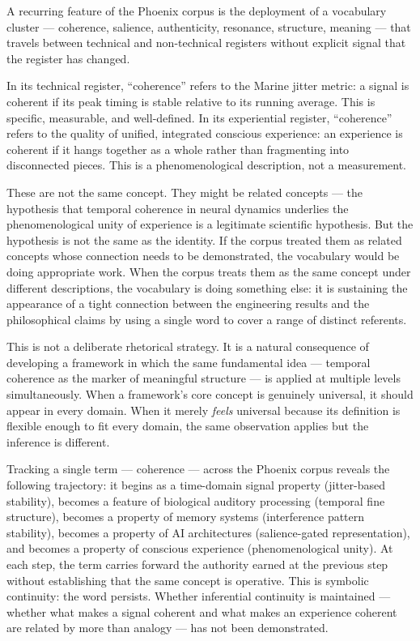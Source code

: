 A recurring feature of the Phoenix corpus is the deployment
of a vocabulary cluster --- coherence, salience, authenticity,
resonance, structure, meaning --- that travels between technical
and non-technical registers without explicit signal that the
register has changed.

In its technical register, ``coherence'' refers to the Marine
jitter metric: a signal is coherent if its peak timing is
stable relative to its running average. This is specific,
measurable, and well-defined. In its experiential register,
``coherence'' refers to the quality of unified, integrated
conscious experience: an experience is coherent if it hangs
together as a whole rather than fragmenting into disconnected
pieces. This is a phenomenological description, not a
measurement.

These are not the same concept. They might be related concepts
--- the hypothesis that temporal coherence in neural dynamics
underlies the phenomenological unity of experience is a
legitimate scientific hypothesis. But the hypothesis is not
the same as the identity. If the corpus treated them as
related concepts whose connection needs to be demonstrated,
the vocabulary would be doing appropriate work. When the
corpus treats them as the same concept under different
descriptions, the vocabulary is doing something else: it
is sustaining the appearance of a tight connection between
the engineering results and the philosophical claims by
using a single word to cover a range of distinct referents.

This is not a deliberate rhetorical strategy. It is a natural
consequence of developing a framework in which the same
fundamental idea --- temporal coherence as the marker of
meaningful structure --- is applied at multiple levels
simultaneously. When a framework's core concept is genuinely
universal, it should appear in every domain. When it merely
\textit{feels} universal because its definition is flexible
enough to fit every domain, the same observation applies
but the inference is different.

\begin{dangerzone}
Tracking a single term --- coherence --- across the Phoenix
corpus reveals the following trajectory: it begins as a
time-domain signal property (jitter-based stability), becomes
a feature of biological auditory processing (temporal fine
structure), becomes a property of memory systems (interference
pattern stability), becomes a property of AI architectures
(salience-gated representation), and becomes a property of
conscious experience (phenomenological unity). At each step,
the term carries forward the authority earned at the previous
step without establishing that the same concept is operative.
This is symbolic continuity: the word persists. Whether
inferential continuity is maintained --- whether what makes
a signal coherent and what makes an experience coherent are
related by more than analogy --- has not been demonstrated.
\end{dangerzone}

